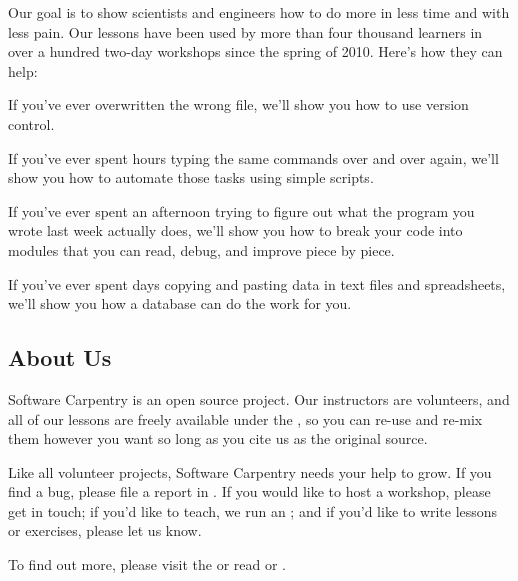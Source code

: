 \documentclass{book}
\begin{document}
Our goal is to show scientists and engineers how to do more in less time
and with less pain. Our lessons have been used by more than four
thousand learners in over a hundred two-day workshops since the spring
of 2010. Here's how they can help:

\begin{swcitemize}
\item
  If you've ever overwritten the wrong file, we'll show you how to use
  version control.
\item
  If you've ever spent hours typing the same commands over and over
  again, we'll show you how to automate those tasks using simple
  scripts.
\item
  If you've ever spent an afternoon trying to figure out what the
  program you wrote last week actually does, we'll show you how to break
  your code into modules that you can read, debug, and improve piece by
  piece.
\item
  If you've ever spent days copying and pasting data in text files and
  spreadsheets, we'll show you how a database can do the work for you.
\end{swcitemize}

\subsection{About Us}

Software Carpentry is an open source project. Our instructors are
volunteers, and all of our lessons are freely available under the
, so you can re-use and re-mix them however you want
so long as you cite us as the original source.

Like all volunteer projects, Software Carpentry needs your help to grow.
If you find a bug, please file a report in
. If you would
like to host a workshop, please
get in touch; if you'd like
to teach, we run an
; and if you'd like to write lessons or exercises, please
let us know.

To find out more, please visit the
or read
 or
.
\end{document}
